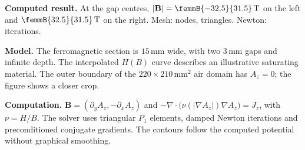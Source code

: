 \documentclass[a4paper,11pt]{article}
\begin{document}
\noindent\textbf{Computed result.}
At the gap centres, $|\mathbf B|=\femmB{-32.5}{31.5}\,\mathrm T$
on the left and $\femmB{32.5}{31.5}\,\mathrm T$ on the right.
Mesh:  nodes,  triangles.
Newton:  iterations.

\medskip
\noindent\textbf{Model.} The ferromagnetic section is $15\,\mathrm{mm}$ wide,
with two $3\,\mathrm{mm}$ gaps and infinite depth.
The interpolated $H(B)$ curve describes an illustrative saturating material.
The outer boundary of the $220\times210\,\mathrm{mm}^2$ air domain has
$A_z=0$; the figure shows a closer crop.

\medskip
\noindent\textbf{Computation.}
$\mathbf B=(\partial_y A_z,-\partial_x A_z)$ and
$-\nabla\!\cdot\!\bigl(\nu(|\nabla A_z|)\nabla A_z\bigr)=J_z$,
with $\nu=H/B$.
The solver uses triangular $P_1$ elements, damped Newton iterations and
preconditioned conjugate gradients. The contours follow the computed
potential without graphical smoothing.
\end{document}
